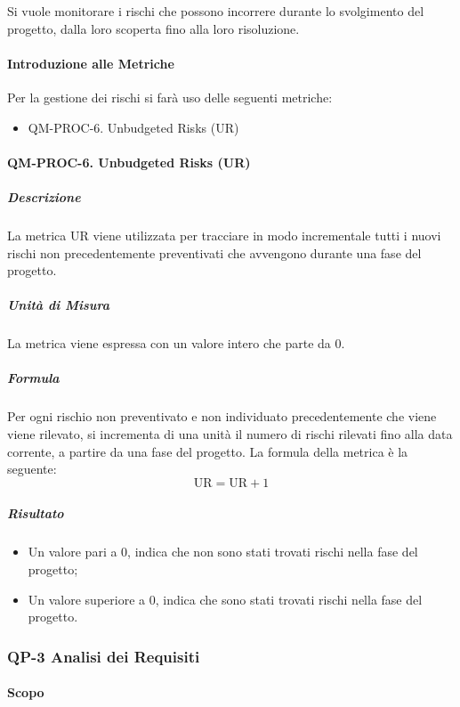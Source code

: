 		Si vuole monitorare i rischi che possono incorrere durante lo svolgimento del progetto, dalla loro scoperta fino alla loro risoluzione.

		\paragraph{Introduzione alle Metriche}

		Per la gestione dei rischi si farà uso delle seguenti metriche:

		\begin{itemize}
			\item QM-PROC-6. Unbudgeted Risks (UR)
		\end{itemize}

		\paragraph{QM-PROC-6. Unbudgeted Risks (UR)}

			\subparagraph{Descrizione}
			La metrica UR viene utilizzata per tracciare in modo incrementale tutti i nuovi rischi non precedentemente preventivati che avvengono durante una fase del progetto.

			\subparagraph{Unità di Misura}
			La metrica viene espressa con un valore intero che parte da 0.

			\subparagraph{Formula}
			Per ogni rischio non preventivato e non individuato precedentemente che viene viene rilevato, si incrementa di una unità il numero di rischi rilevati fino alla data corrente, a partire da una fase del progetto.
			La formula della metrica è la seguente:
			\[
				\text{UR} = \text{UR} + 1
			\]

			\subparagraph{Risultato}
			\begin{itemize}
				\item Un valore pari a 0, indica che non sono stati trovati rischi nella fase del progetto;
				\item Un valore superiore a 0, indica che sono stati trovati rischi nella fase del progetto.
			\end{itemize}

	\subsubsection{QP-3 Analisi dei Requisiti}

		\paragraph{Scopo}

